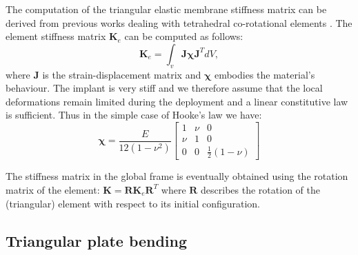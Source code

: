 The computation of the triangular elastic membrane stiffness matrix can be derived from previous works dealing with tetrahedral co-rotational elements \citep[like][for instance]{Muller04b}. The element stiffness matrix $\textbf{K}_e$ can be computed as follows:
%
\begin{equation}
\textbf{K}_e = \int_v \textbf{J} \boldsymbol\chi \textbf{J}^{T} dV,
\end{equation}
where $\textbf{J}$ is the strain-displacement matrix and $\boldsymbol\chi$ embodies the material's behaviour. The implant is very stiff and we therefore assume that the local deformations remain limited during the deployment and a linear constitutive law is sufficient. Thus in the simple case of Hooke's law we have:
%
\begin{equation}
\boldsymbol\chi = \frac{E}{12(1-\nu^2)}
\begin{bmatrix}
1 & \nu & 0 \\
\nu & 1 & 0 \\
0 & 0 & \frac{1}{2} (1-\nu)
\end{bmatrix}
\end{equation}

The stiffness matrix in the global frame is eventually obtained using the rotation matrix of the element: $\textbf{K} = \textbf{R} \textbf{K}_e \textbf{R}^{T}$ where $\textbf{R}$ describes the rotation of the (triangular) element with respect to its initial configuration.

\subsection{Triangular plate bending}

